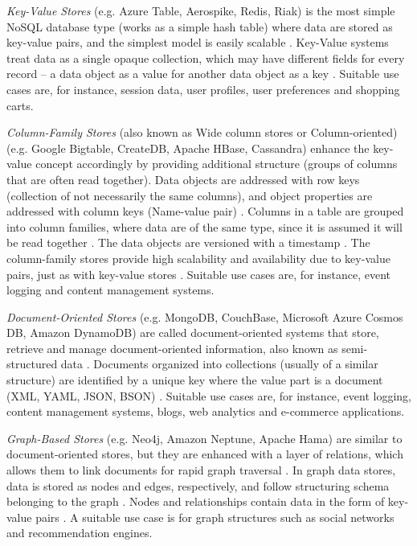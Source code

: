 				\textit{Key-Value Stores} (e.g. Azure Table, Aerospike, Redis, Riak) is the most simple NoSQL database type (works as a simple hash table) where data are stored as key-value pairs, and the simplest model is easily scalable \cite{AndreasMeier2019}. Key-Value systems treat data as a single opaque collection, which may have different fields for every record -- a data object as a value for another data object as a key \cite{AndreasMeier2019}. Suitable use cases are, for instance, session data, user profiles, user preferences and shopping carts.
				
				\textit{Column-Family Stores} (also known as Wide column stores or Column-oriented) (e.g. Google Bigtable, CreateDB, Apache HBase, Cassandra) enhance the key-value concept accordingly by providing additional structure (groups of columns that are often read together). Data objects are addressed with row keys (collection of not necessarily the same columns), and object properties are addressed with column keys (Name-value pair) \cite{AndreasMeier2019}. Columns in a table are grouped into column families, where data are of the same type, since it is assumed it will be read together \cite{AndreasMeier2019}. The data objects are versioned with a timestamp \cite{AndreasMeier2019}. The column-family stores provide high scalability and availability due to key-value pairs, just as with key-value stores \cite{AndreasMeier2019}. Suitable use cases are, for instance, event logging and content management systems.
				
				\textit{Document-Oriented Stores} (e.g. MongoDB, CouchBase, Microsoft Azure Cosmos DB, Amazon DynamoDB) are called document-oriented systems that store, retrieve and manage document-oriented information, also known as semi-structured data   \cite{AndreasMeier2019}. Documents organized into collections (usually of a similar structure) are identified by a unique key where the value part is a document (XML, YAML, JSON, BSON) \cite{AndreasMeier2019}. Suitable use cases are, for instance, event logging, content management systems, blogs, web analytics and e-commerce applications.
				
				\textit{Graph-Based Stores} (e.g. Neo4j, Amazon Neptune, Apache Hama) are similar to document-oriented stores, but they are enhanced with a layer of relations, which allows them to link documents for rapid graph traversal \cite{AndreasMeier2019}. In graph data stores, data is stored as nodes and edges, respectively, and follow structuring schema belonging to the graph . Nodes and relationships contain data in the form of key-value pairs \cite{AndreasMeier2019}. A suitable use case is for graph structures such as social networks and recommendation engines.
				
